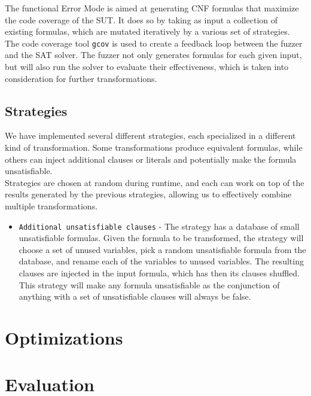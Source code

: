 \documentclass{article}
\begin{document}
The functional Error Mode is aimed at generating CNF formulas that maximize the code coverage of the SUT. 
It does so by taking as input a collection of existing formulas, which are mutated iteratively by a 
various set of strategies.\\

The code coverage tool \verb|gcov| is used to create a feedback loop between the fuzzer and the SAT solver.
The fuzzer not only generates formulas for each given input, but will also run the solver to evaluate
their effectiveness, which is taken into consideration for further transformations.

\subsection{Strategies}

We have implemented several different strategies, each specialized in a different kind of transformation.
Some transformations produce equivalent formulas, while others can inject additional clauses or literals
and potentially make the formula unsatisfiable. \\

Strategies are chosen at random during runtime, and each can work on top of the results generated by the
previous strategies, allowing us to effectively combine multiple transformations. \\

\begin{itemize}

\item \verb|Additional unsatisfiable clauses| - The strategy has a database of small unsatisfiable formulas.
Given the formula to be transformed, the strategy will choose a set of unused variables, pick a random
unsatisfiable formula from the database, and rename each of the variables to unused variables. The resulting
clauses are injected in the input formula, which has then its clauses shuffled.
This strategy will make any formula unsatisfiable as the conjunction of anything with a set of unsatisfiable
clauses will always be false.

\end{itemize}


\section{Optimizations}

\section{Evaluation}
\end{document}
